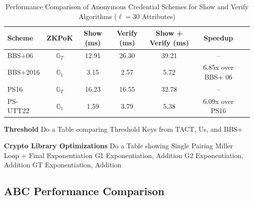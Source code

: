 \begin{table}[h]
\centering
\caption{Performance Comparison of Anonymous Credential Schemes for Show and Verify Algorithms ($\ell = 30$ Attributes)}
\label{tab:anon_creds_performance_old_gen_vs_new}
\begin{tabular}{|l|c|c|c|c|c|c|}
\hline
\textbf{Scheme} & \textbf{ZKPoK}  & \textbf{Show (ms)} & \textbf{Verify (ms)}  & \textbf{Show + Verify (ms)} & \textbf{Speedup} \\
\hline
BBS+06 & $\mathbb{G}_T$ & 12.91  & 26.30 & 39.21 & -- \\
\hline
BBS+2016 & $\mathbb{G}_1$ & 3.15  & 2.57 & 5.72 & 6.85x over BBS+ 06 \\
\hline
PS16 & $\mathbb{G}_T$ & 16.23  & 16.55 & 32.78 & -- \\
\hline
PS-UTT22 & $\mathbb{G}_1$ & 1.59  & 3.79 & 5.38 & 6.09x over PS16 \\
\hline
\end{tabular}
\end{table}


\textbf{Threshold}
Do a Table comparing Threshold Keys from TACT, Us, and BBS+




\textbf{Crypto Library Optimizations}
Do a Table showing 
Single Pairing
Miller Loop + Final Exponentiation
G1 Exponentiation, Addition
G2 Exponentiation, Addition
GT Exponentiation, Addition












































\subsection{ABC Performance Comparison}


